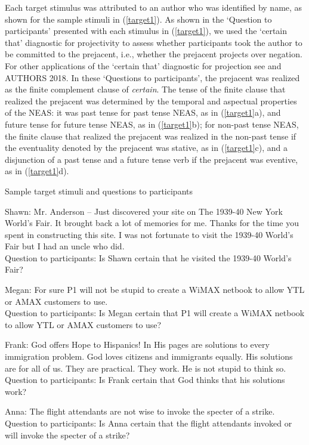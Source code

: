 \documentclass[11pt,fleqn]{article}
\newcommand{\6}{\mbox{$[\hspace*{-.6mm}[$}}
\newcommand{\9}{\mbox{$]\hspace*{-.6mm}]$}}
\begin{document}
Each target stimulus was attributed to an author who was identified by name, as shown for the sample stimuli in (\ref{target1}). As shown in the `Question to participants' presented with each stimulus in (\ref{target1}), we used the `certain that' diagnostic for projectivity to assess whether participants took the author to be committed to the prejacent, i.e., whether the prejacent projects over negation. For other applications of the `certain that' diagnostic for projection see \citealt{tonhauser-salt26,djaerv-bacovcin-salt27,stevens-etal2017} and AUTHORS 2018. In these `Questions to participants', the prejacent was realized as the finite complement clause of {\em certain}. The tense of the finite clause that realized the prejacent was determined by the temporal and aspectual properties of the
NEAS: it was past tense for past tense NEAS, as in (\ref{target1}a), and future tense for future tense NEAS, as in (\ref{target1}b); for non-past tense NEAS, the finite clause that realized the prejacent was realized in the non-past tense if the eventuality denoted by the prejacent was
stative, as in (\ref{target1}c), and a disjunction of a past tense and a future tense verb if the prejacent was eventive, as in (\ref{target1}d).


\begin{exe} \ex\label{target1} Sample target stimuli and questions to
participants 

\begin{xlist} 

\ex Shawn: Mr. Anderson --  Just discovered your
site on The 1939-40 New York World's Fair. It brought back a lot of
memories for me. Thanks for the time you spent in constructing this
site. I was not fortunate to visit the 1939-40 World's Fair but I
had an uncle who did.
\\ Question to participants: Is Shawn certain that he visited the 1939-40 World's Fair?

\ex Megan: For sure P1 will not be stupid to create a WiMAX netbook to allow YTL or AMAX customers to use.
\\ Question to participants: Is Megan certain that P1 will create a WiMAX netbook to allow YTL or AMAX customers to use?

\ex Frank: God offers Hope to Hispanics! In His pages are solutions to every immigration problem. God loves citizens and immigrants equally. His solutions are for all of us. They are practical. They work. He is not stupid to think so.
\\ Question to participants: Is Frank certain that God thinks that his solutions work?

\ex Anna: The flight attendants are not wise to invoke the specter
of a strike. \\ Question to participants: Is Anna certain that the
flight attendants invoked or will invoke the specter of a strike?

\end{xlist}
\end{exe}
\end{document}
